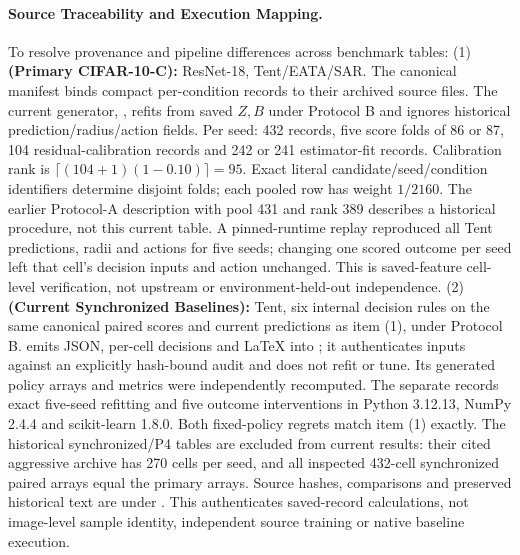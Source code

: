 \paragraph{Source Traceability and Execution Mapping.}
{\footnotesize
To resolve provenance and pipeline differences across benchmark tables:
(1)~\textbf{ (Primary CIFAR-10-C):} ResNet-18, Tent/EATA/SAR. The canonical manifest binds compact per-condition records to their archived source files. The current generator, , refits from saved $Z,B$ under Protocol B and ignores historical prediction/radius/action fields. Per seed: 432 records, five score folds of 86 or 87, 104 residual-calibration records and 242 or 241 estimator-fit records. Calibration rank is $\lceil(104+1)(1-0.10)\rceil=95$. Exact literal candidate/seed/condition identifiers determine disjoint folds; each pooled row has weight $1/2160$. The earlier Protocol-A description with pool 431 and rank 389 describes a historical procedure, not this current table. A pinned-runtime replay reproduced all Tent predictions, radii and actions for five seeds; changing one scored outcome per seed left that cell's decision inputs and action unchanged. This is saved-feature cell-level verification, not upstream or environment-held-out independence.
(2)~\textbf{ (Current Synchronized Baselines):} Tent, six internal decision rules on the same canonical paired scores and current predictions as item (1), under Protocol B.  emits JSON, per-cell decisions and LaTeX into ; it authenticates inputs against an explicitly hash-bound audit and does not refit or tune. Its generated policy arrays and metrics were independently recomputed. The separate  records exact five-seed refitting and five outcome interventions in Python 3.12.13, NumPy 2.4.4 and scikit-learn 1.8.0. Both fixed-policy regrets match item (1) exactly. The historical synchronized/P4 tables are excluded from current results: their cited aggressive archive has 270 cells per seed, and all inspected 432-cell synchronized paired arrays equal the primary arrays. Source hashes, comparisons and preserved historical text are under . This authenticates saved-record calculations, not image-level sample identity, independent source training or native baseline execution.
}
